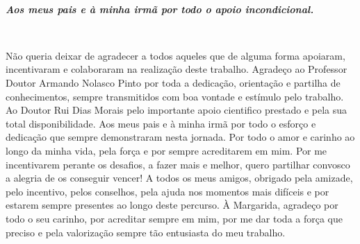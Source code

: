 \EndTitlePage

\titlepage\ \endtitlepage

\TitlePage
\hspace{75mm}\begin{minipage}{110mm} %
 								\vspace{100mm}
								\begin{flushright}
            \begin{Large}\emph{\textbf{Aos meus pais e à minha irmã por todo o apoio incondicional.}}\end{Large}
						\end{flushright}
						 \end{minipage}
						\vfill
\EndTitlePage

\titlepage\ \endtitlepage

\TitlePage
  \vspace*{55mm}
       {Não queria deixar de agradecer a todos aqueles que de alguma forma apoiaram, incentivaram e colaboraram na realização deste trabalho.}
  \TEXT{}
       {Agradeço ao Professor Doutor Armando Nolasco Pinto por toda a dedicação, orientação e partilha de conhecimentos, sempre transmitidos com boa vontade e estímulo pelo trabalho.}
  \TEXT{}
       {Ao Doutor Rui Dias Morais pelo importante apoio cientifico prestado e pela sua total disponibilidade.}
  \TEXT{}
       {Aos meus pais e à minha irmã por todo o esforço e dedicação que sempre demonstraram nesta jornada. Por todo o amor e carinho ao longo da minha vida, pela força e por sempre acreditarem em mim. Por me incentivarem perante os desafios, a fazer mais e melhor, quero partilhar convosco a alegria de os conseguir vencer!}
  \TEXT{}
       {A todos os meus amigos, obrigado pela amizade, pelo incentivo, pelos conselhos, pela ajuda nos momentos mais difíceis e por estarem sempre presentes ao longo deste percurso.}
  \TEXT{}
       {À Margarida, agradeço por todo o seu carinho, por acreditar sempre em mim, por me dar toda a força que preciso e pela valorização sempre tão entusiasta do meu trabalho.
       }
\EndTitlePage
\titlepage\ \endtitlepage

